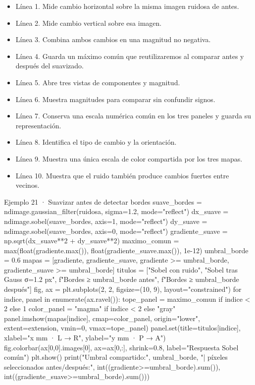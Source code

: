 
\begin{itemize}

\item Línea 1. Mide cambio horizontal sobre la misma imagen ruidosa de antes.

\item Línea 2. Mide cambio vertical sobre esa imagen.

\item Línea 3. Combina ambos cambios en una magnitud no negativa.

\item Línea 4. Guarda un máximo común que reutilizaremos al comparar antes y después del suavizado.

\item Línea 5. Abre tres vistas de componentes y magnitud.

\item Línea 6. Muestra magnitudes para comparar sin confundir signos.

\item Línea 7. Conserva una escala numérica común en los tres paneles y guarda su representación.

\item Línea 8. Identifica el tipo de cambio y la orientación.

\item Línea 9. Muestra una única escala de color compartida por los tres mapas.

\item Línea 10. Muestra que el ruido también produce cambios fuertes entre vecinos.

\end{itemize}

\begin{Codigo}{Ejemplo 21 · Suavizar antes de detectar bordes}
suave_bordes = ndimage.gaussian_filter(ruidosa, sigma=1.2, mode="reflect")
dx_suave = ndimage.sobel(suave_bordes, axis=1, mode="reflect")
dy_suave = ndimage.sobel(suave_bordes, axis=0, mode="reflect")
gradiente_suave = np.sqrt(dx_suave**2 + dy_suave**2)
maximo_comun = max(float(gradiente.max()), float(gradiente_suave.max()), 1e-12)
umbral_borde = 0.6
mapas = [gradiente, gradiente_suave, gradiente >= umbral_borde, gradiente_suave >= umbral_borde]
titulos = ["Sobel con ruido", "Sobel tras Gauss σ=1.2 px", f"Bordes ≥ {umbral_borde} antes", f"Bordes ≥ {umbral_borde} después"]
fig, ax = plt.subplots(2, 2, figsize=(10, 9), layout="constrained")
for indice, panel in enumerate(ax.ravel()):
    tope_panel = maximo_comun if indice < 2 else 1
    color_panel = "magma" if indice < 2 else "gray"
    panel.imshow(mapas[indice], cmap=color_panel, origin="lower", extent=extension, vmin=0, vmax=tope_panel)
    panel.set(title=titulos[indice], xlabel="x mm · L → R", ylabel="y mm · P → A")
fig.colorbar(ax[0,0].images[0], ax=ax[0,:], shrink=0.8, label="Respuesta Sobel común")
plt.show()
print("Umbral compartido:", umbral_borde, "| píxeles seleccionados antes/después:", int((gradiente>=umbral_borde).sum()), int((gradiente_suave>=umbral_borde).sum()))
\end{Codigo}


